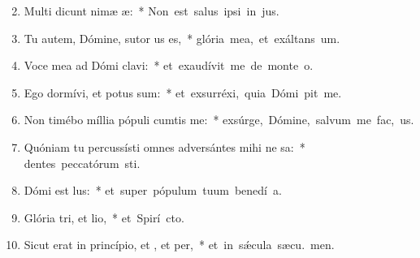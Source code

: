 \begin{flushleft}
\begin{enumerate}[leftmargin=*]
\setcounter{enumi}{1}

\item Multi dicunt nimæ æ:~* \mbox{Non est salus ipsi in  jus.}

\item Tu autem, Dómine, sutor us es,~* \mbox{glória mea, et exáltans  um.}

\item Voce mea ad Dómi clavi:~* \mbox{et exaudívit me de monte  o.}

\item Ego dormívi, et potus sum:~* \mbox{et exsurréxi, quia Dómi pit me.}

\item Non timébo míllia pópuli cumtis me:~* \mbox{exsúrge, Dómine, salvum me fac,  us.}

\item Quóniam tu percussísti omnes adversántes mihi ne sa:~* \mbox{dentes peccatórum sti.}

\item Dómi est lus:~* \mbox{et super pópulum tuum benedí a.}

\item Glória tri, et lio,~* \mbox{et Spirí cto.}

\item Sicut erat in princípio, et , et per,~* \mbox{et in s\'{\ae}cula sæcu. men.}

\end{enumerate}
\end{flushleft}

